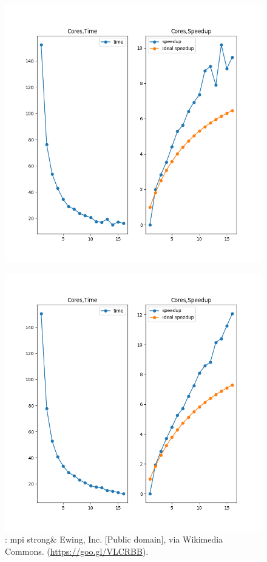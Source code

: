 \begin{figure}[h]
  \centering
  \begin{minipage}{0.45\linewidth}
      \includegraphics[width=\linewidth]{mpi_strong.out}
      \caption{: mpi strong\&
        Ewing, Inc. [Public domain], via Wikimedia
        Commons. (\url{https://goo.gl/VLCRBB}).}
        \label{fig:mpi_strong}
    \end{minipage}
  \hspace{.05\linewidth}
 \begin{minipage}{0.45\linewidth}
  \includegraphics[width=\linewidth]{omp_strong.out}

\end{minipage}
\end{figure}
